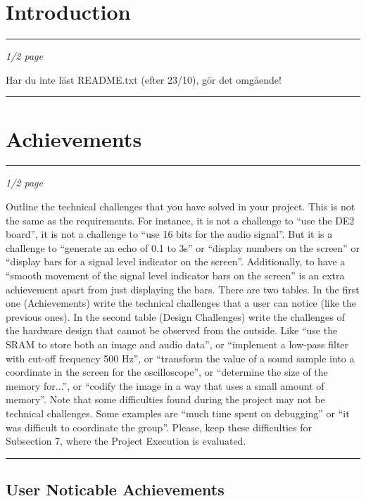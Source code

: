 
\pagestyle{plain}
\setcounter{page}{1}

\section{Introduction}\label{cha:intro}
\hrule
\em 1/2 page

{\LARGE Har du inte läst README.txt (efter 23/10), gör det omgående!}
\em
\hrule


\section{Achievements}\label{cha:achievements}
\hrule
\em
1/2 page

Outline the technical challenges that you have solved in your project. This is not the same as the requirements. For instance, it is not a challenge to “use the DE2 board”, it is not a challenge to “use 16 bits for the audio signal”. But it is a challenge to “generate an echo of 0.1 to 3s” or “display numbers on the screen” or “display bars for a signal level indicator on the screen”. Additionally, to have a “smooth movement of the signal level indicator bars on the screen” is an extra achievement apart from just displaying the bars. There are two tables. In the first one (Achievements) write the technical challenges that a user can notice (like the previous ones). In the second table (Design Challenges) write the challenges of the hardware design that cannot be observed from the outside. Like “use the SRAM to store both an image and audio data”, or “implement a low-pass filter with cut-off frequency 500 Hz”, or “transform the value of a sound sample into a coordinate in the screen for the oscilloscope”, or “determine the size of the memory for...”, or “codify the image in a way that uses a small amount of memory”. Note that some difficulties found during the project may not be technical challenges. Some examples are “much time spent on debugging” or “it was difficult to coordinate the group”. Please, keep these difficulties for Subsection 7, where the Project Execution is evaluated.
\em
\hrule

\subsection{User Noticable Achievements}\label{sec:userachievments}



